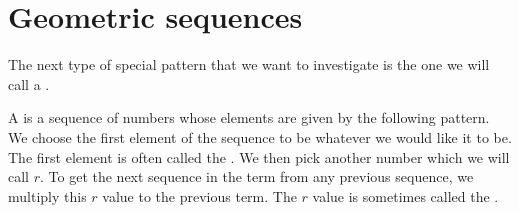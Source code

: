 \documentclass{ximera}
\begin{document}
\section{Geometric sequences}
The next type of special pattern that we want to investigate is the one we will call a .
\begin{definition}
A  is a sequence of numbers whose elements are given by the following pattern. We choose the first element of the sequence to be whatever we would like it to be. The first element is often called the . We then pick another number which we will call $r$. To get the next sequence in the term from any previous sequence, we multiply this $r$ value to the previous term. The $r$ value is sometimes called the .
\end{definition}
\end{document}
